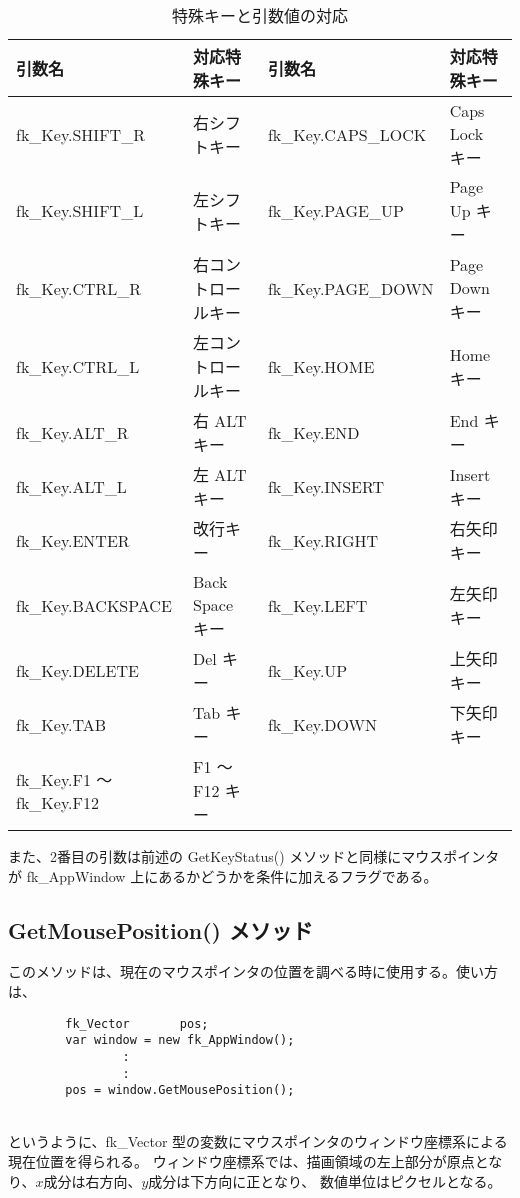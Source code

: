 \begin{table}[H]
\caption{特殊キーと引数値の対応}
\label{tbl:fkSpecialKey}
\begin{center}
\begin{small}
\begin{tabular}{|l|l||l|l|}
\hline
引数名 & 対応特殊キー & 引数名 & 対応特殊キー \\ \hline \hline
fk\_Key.SHIFT\_R	& 右シフトキー &
	fk\_Key.CAPS\_LOCK	& Caps Lock キー \\ \hline
fk\_Key.SHIFT\_L	& 左シフトキー &
	fk\_Key.PAGE\_UP	& Page Up キー \\ \hline
fk\_Key.CTRL\_R	& 右コントロールキー &
	fk\_Key.PAGE\_DOWN	& Page Down キー \\ \hline
fk\_Key.CTRL\_L	& 左コントロールキー &
	fk\_Key.HOME	& Home キー \\ \hline
fk\_Key.ALT\_R	& 右 ALT キー &
	fk\_Key.END		& End キー \\ \hline
fk\_Key.ALT\_L	& 左 ALT キー &
	fk\_Key.INSERT	& Insert キー \\ \hline
fk\_Key.ENTER	& 改行キー &
	fk\_Key.RIGHT	& 右矢印キー \\ \hline
fk\_Key.BACKSPACE	& Back Space キー &
	fk\_Key.LEFT	& 左矢印キー \\ \hline
fk\_Key.DELETE	& Del キー &
	fk\_Key.UP		& 上矢印キー \\ \hline
fk\_Key.TAB		& Tab キー &
	fk\_Key.DOWN	& 下矢印キー \\ \hline
fk\_Key.F1 〜 fk\_Key.F12 & F1 〜 F12 キー &
		& \\ \hline
\end{tabular}
\end{small}
\end{center}
\end{table}

また、2番目の引数は前述の GetKeyStatus() メソッドと同様にマウスポインタが
fk\_AppWindow 上にあるかどうかを条件に加えるフラグである。

\subsection{GetMousePosition() メソッド}
このメソッドは、現在のマウスポインタの位置を調べる時に使用する。使い方は、
\\
\begin{breakbox}
\begin{verbatim}
        fk_Vector       pos;
        var window = new fk_AppWindow();
                :
                :
        pos = window.GetMousePosition();
\end{verbatim}
\end{breakbox}
~ \\
というように、fk\_Vector 型の変数にマウスポインタのウィンドウ座標系による現在位置を得られる。
ウィンドウ座標系では、描画領域の左上部分が原点となり、\(x\)成分は右方向、\(y\)成分は下方向に正となり、
数値単位はピクセルとなる。

